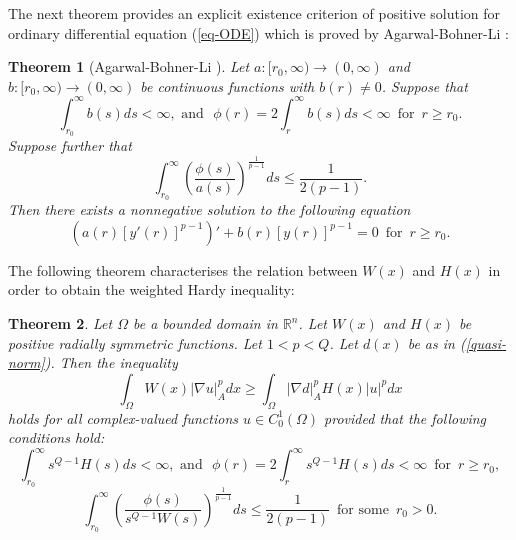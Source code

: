 \documentclass[a4paper,12pt,reqno]{amsart}
\renewcommand\eqref[1]{(\ref{#1})} %
\theoremstyle{theorem}
\numberwithin{equation}{section}
\theoremstyle{plain}
\newtheorem{thm}{Theorem}[section]
\theoremstyle{definition}
\theoremstyle{defi}
\begin{document}
The next theorem provides an explicit existence criterion of positive solution for ordinary differential equation \eqref{eq-ODE} which is proved by Agarwal-Bohner-Li \cite[Theorem 4.6.13]{ABL_book}:
\begin{thm}[Agarwal-Bohner-Li \cite{ABL_book}]\label{ABL-thm}
	Let $a:[r_0, \infty) \rightarrow (0,\infty)$ and $b:[r_0, \infty) \rightarrow (0,\infty)$ be  continuous functions with $b(r) \neq 0$. 
	Suppose that 
	\begin{equation*}
	\int_{r_0}^{\infty} b(s) ds< \infty, \,\, \text{and} \,\, \,\,	\phi(r) = 2 \int_{r}^{\infty} b(s)ds < \infty \,\,\, \text{for} \,\,\, r\geq r_0.
	\end{equation*}
	Suppose further that 
	\begin{equation}
	\int_{r_0}^{\infty} \left( \frac{\phi(s)}{a(s)}\right)^{\frac{1}{p-1}} ds  \leq \frac{1}{2(p-1)}.
	\end{equation}
	Then there exists a nonnegative solution to the following equation
	\begin{equation}
	(a(r) [y'(r)]^{p-1})' + b(r)[y(r)]^{p-1} =0 \,\,\, \text{for} \,\,\, r\geq r_0.
	\end{equation}
\end{thm}
The following theorem characterises the relation between $W(x)$ and $H(x)$ in order to obtain the weighted Hardy inequality:
\begin{thm}\label{main_thm}
	Let $\Omega$ be a bounded domain in $\mathbb{R}^n$. Let $W(x)$ and $H(x)$ be positive radially symmetric functions. Let $1<p<Q$. Let $d(x)$ be as in \eqref{quasi-norm}. Then the inequality 
	\begin{equation}
	\int_{\Omega} W(x) |\nabla u|^p_A dx \geq \int_{\Omega}|\nabla d|^p_A H(x) |u|^p dx
	\end{equation}
	holds for all complex-valued functions $u \in C^1_0(\Omega)$ provided that the following conditions hold: 
	\begin{equation}\label{2.9}
	\int_{r_0}^{\infty} s^{Q-1}H(s) ds< \infty, \,\, \text{and} \,\, \,\,	\phi(r) = 2 \int_{r}^{\infty} s^{Q-1}H(s) ds < \infty \,\,\, \text{for} \,\,\, r\geq r_0,
	\end{equation}
	\begin{equation}\label{2.10}
	\int_{r_0}^{\infty} \left( \frac{\phi(s)}{s^{Q-1}W(s)}\right)^{\frac{1}{p-1}} ds  \leq \frac{1}{2(p-1)} \,\,\, \text{for some} \,\,\, r_0>0.
	\end{equation}
\end{thm}
\end{document}
